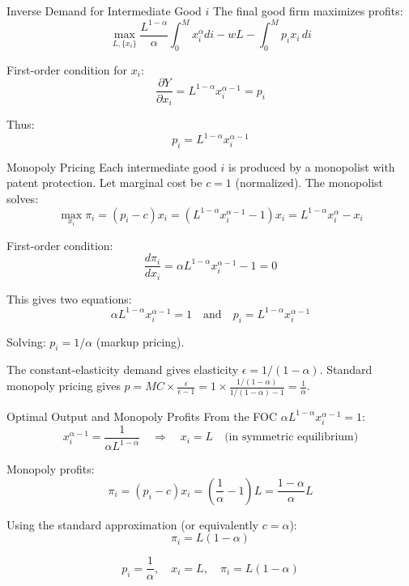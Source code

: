 \documentclass[a4paper,11pt]{article}
\begin{document}
\bigskip
\begin{derivationbox}{Inverse Demand for Intermediate Good $i$}
The final good firm maximizes profits:
\[
\max_{L, \{x_i\}} \frac{L^{1-\alpha}}{\alpha} \int_0^M x_i^\alpha di - wL - \int_0^M p_i x_i \, di
\]

First-order condition for $x_i$:
\[
\frac{\partial Y}{\partial x_i} = L^{1-\alpha} x_i^{\alpha-1} = p_i
\]

Thus:
\[
\boxed{p_i = L^{1-\alpha} x_i^{\alpha-1}}
\tag{Inverse Demand}
\]
\end{derivationbox}

\bigskip
\begin{derivationbox}{Monopoly Pricing}
Each intermediate good $i$ is produced by a monopolist with patent protection. Let marginal cost be $c = 1$ (normalized). The monopolist solves:
\[
\max_{x_i} \pi_i = (p_i - c)x_i = (L^{1-\alpha} x_i^{\alpha-1} - 1)x_i = L^{1-\alpha} x_i^\alpha - x_i
\]

First-order condition:
\[
\frac{d\pi_i}{dx_i} = \alpha L^{1-\alpha} x_i^{\alpha-1} - 1 = 0
\]

This gives two equations:
\[
\alpha L^{1-\alpha} x_i^{\alpha-1} = 1 \quad \text{and} \quad p_i = L^{1-\alpha} x_i^{\alpha-1}
\]

Solving: $p_i = 1/\alpha$ (markup pricing).

The constant-elasticity demand gives elasticity $\epsilon = 1/(1-\alpha)$. Standard monopoly pricing gives $p = MC \times \frac{\epsilon}{\epsilon-1} = 1 \times \frac{1/(1-\alpha)}{1/(1-\alpha)-1} = \frac{1}{\alpha}$.
\end{derivationbox}

\bigskip
\begin{derivationbox}{Optimal Output and Monopoly Profits}
From the FOC $\alpha L^{1-\alpha} x_i^{\alpha-1} = 1$:
\[
x_i^{\alpha-1} = \frac{1}{\alpha L^{1-\alpha}} \quad \Rightarrow \quad x_i = L \quad \text{(in symmetric equilibrium)}
\]

Monopoly profits:
\[
\pi_i = (p_i - c)x_i = \left(\frac{1}{\alpha} - 1\right)L = \frac{1-\alpha}{\alpha}L
\]

Using the standard approximation (or equivalently $c = \alpha$):
\[
\boxed{\pi_i = L(1-\alpha)}
\tag{Monopoly Profits}
\]
\end{derivationbox}

\begin{resultbox}
\[
\boxed{p_i = \frac{1}{\alpha}}, \quad \boxed{x_i = L}, \quad \boxed{\pi_i = L(1-\alpha)}
\tag{Monopoly Equilibrium}
\]
\end{resultbox}
\end{document}

